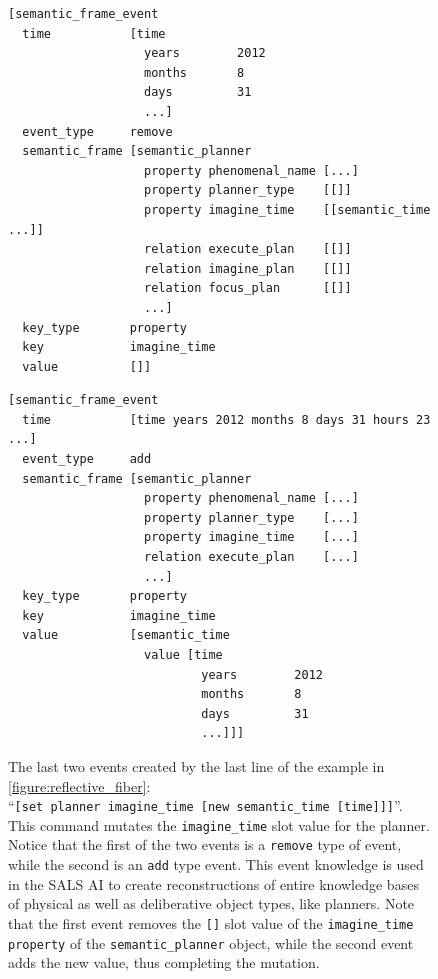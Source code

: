 \begin{figure}[h]
\centering
{\scriptsize
\begin{Verbatim}[frame=single]
[semantic_frame_event
  time           [time
                   years        2012
                   months       8
                   days         31
                   ...]
  event_type     remove
  semantic_frame [semantic_planner
                   property phenomenal_name [...]
                   property planner_type    [[]]
                   property imagine_time    [[semantic_time ...]]
                   relation execute_plan    [[]]
                   relation imagine_plan    [[]]
                   relation focus_plan      [[]]
                   ...]
  key_type       property
  key            imagine_time
  value          []]
\end{Verbatim}
\begin{Verbatim}[frame=single]
[semantic_frame_event
  time           [time years 2012 months 8 days 31 hours 23 ...]
  event_type     add
  semantic_frame [semantic_planner
                   property phenomenal_name [...]
                   property planner_type    [...]
                   property imagine_time    [...]
                   relation execute_plan    [...]
                   ...]
  key_type       property
  key            imagine_time
  value          [semantic_time
                   value [time
                           years        2012
                           months       8
                           days         31
                           ...]]]
\end{Verbatim}
}
\caption[The last two events created by the last line of the example
  in {\mbox{\autoref{figure:reflective_fiber}}}.]{The last two events
  created by the last line of the example in
  {\mbox{\autoref{figure:reflective_fiber}}}:
  ``{\tt{[set~planner~imagine\_time~[new~semantic\_time~[time]]]}}''. This
  command mutates the {\tt{imagine\_time}} slot value for the planner.
  Notice that the first of the two events is a {\tt{remove}} type of
  event, while the second is an {\tt{add}} type event.  This event
  knowledge is used in the SALS AI to create reconstructions of entire
  knowledge bases of physical as well as deliberative object types,
  like planners.  Note that the first event removes the {\tt{[]}} slot
  value of the {\tt{imagine\_time}} {\tt{property}} of the
  {\tt{semantic\_planner}} object, while the second event adds the new
  value, thus completing the mutation.}
\label{figure:remove_add_set_events}
\end{figure}

